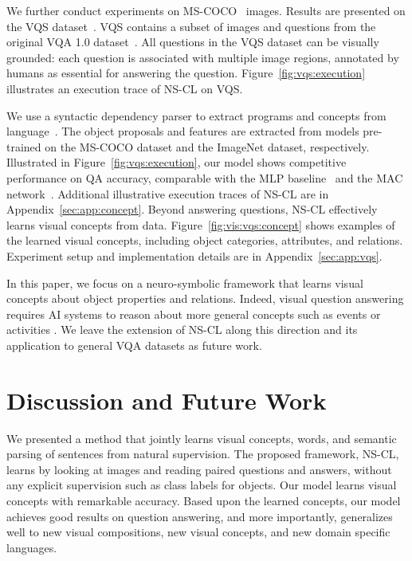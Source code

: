 \documentclass{article} \usepackage{iclr2019_conference,times}
\newcommand{\fig}[1]{Figure~\ref{#1}}
\newcommand{\model}{NS-CL\xspace}
\newcommand{\revisioncolor}{}
\begin{document}
{\revisioncolor

We further conduct experiments on MS-COCO~\citep{lin2014microsoft} images. Results are presented on the VQS dataset~\citep{Gan2017Vqs}. VQS contains a subset of images and questions from the original VQA 1.0 dataset~\citep{Antol2015Vqa}. All questions in the VQS dataset can be visually grounded: each question is associated with multiple image regions, annotated by humans as essential for answering the question. \fig{fig:vqs:execution} illustrates an execution trace of \model on VQS.

We use a syntactic dependency parser to extract programs and concepts from language~\citep{Andreas2016Learning,Schuster2015Generating}. The object proposals and features are extracted from models pre-trained on the MS-COCO dataset and the ImageNet dataset, respectively. Illustrated in \fig{fig:vqs:execution}, our model shows competitive performance on QA accuracy, comparable with the MLP baseline~\citep{Jabri2016Revisiting} and the MAC network~\citep{Hudson2018Compositional}. Additional illustrative execution traces of \model are in Appendix~\ref{sec:app:concept}. Beyond answering questions, \model effectively learns visual concepts from data. \fig{fig:vis:vqs:concept} shows examples of the learned visual concepts, including object categories, attributes, and relations. Experiment setup and implementation details are in Appendix~\ref{sec:app:vqs}. 

In this paper, we focus on a neuro-symbolic framework that learns visual concepts about object properties and relations. Indeed, visual question answering requires AI systems to reason about more general concepts such as events or activities \citep{Levin1993English}. We leave the extension of \model along this direction and its application to general VQA datasets \citep{Antol2015Vqa} as future work.
}
\section{Discussion and Future Work}
We presented a method that jointly learns visual concepts, words, and semantic parsing of sentences from natural supervision. The proposed framework, \model, learns by looking at images and reading paired questions and answers, without any explicit supervision such as class labels for objects. Our model learns visual concepts with remarkable accuracy. Based upon the learned concepts, our model achieves good results on question answering, and more importantly, generalizes well to new visual compositions, new visual concepts, and new domain specific languages.
\end{document}
